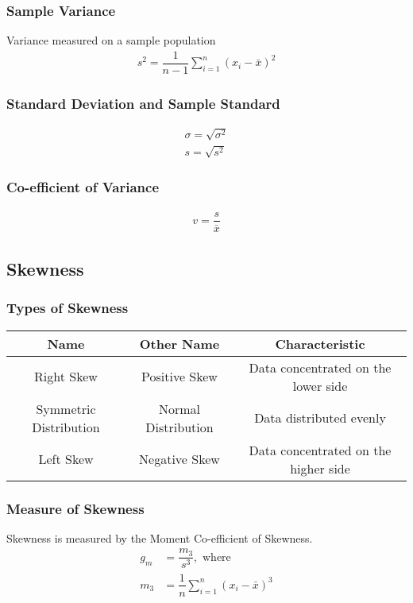 \documentclass[openany,b5paper]{article}
\begin{document}
\subsubsection{Sample Variance}
Variance measured on a sample population
\begin{align}
s^2 = \dfrac{1}{n-1} \sum_{i=1}^{n} \left( x_i - \bar{x} \right)^2
\end{align}

\subsubsection{Standard Deviation and Sample Standard}
\begin{align}
\sigma = \sqrt{\sigma^2}\\
s=\sqrt{s^2}
\end{align}

\subsubsection{Co-efficient of Variance}
\begin{align}
v = \dfrac{s}{\bar{x}}
\end{align}

\subsection{Skewness}
\subsubsection{Types of Skewness}
\begin{table}[h!]
\begin{tabular}{c|c|c}
Name & Other Name & Characteristic\\
\hline
Right Skew & Positive Skew & Data concentrated on the lower side\\
Symmetric Distribution & Normal Distribution & Data distributed evenly\\
Left Skew & Negative Skew & Data concentrated on the higher side
\end{tabular}
\end{table}

\subsubsection{Measure of Skewness}
Skewness is measured by the Moment Co-efficient of Skewness.
\begin{align}
g_m &= \dfrac{m_3}{s^3}, \text{ where}\\
m_3 &= \dfrac{1}{n}\sum_{i=1}^{n} \left( x_i - \bar{x} \right)^3
\end{align}
\end{document}
